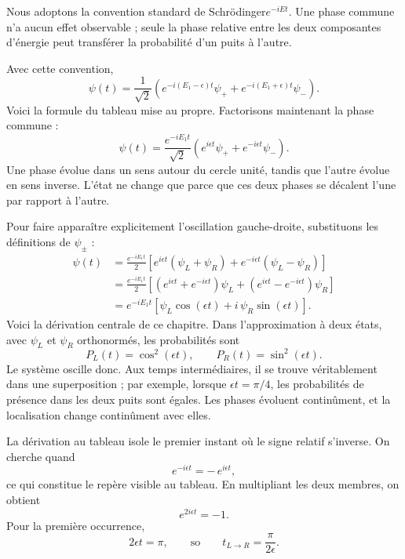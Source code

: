 Nous adoptons la convention standard de Schr\"odinger\(e^{-iEt}\). Une phase commune n’a aucun effet observable ; seule la phase relative entre les deux composantes d’énergie peut transférer la probabilité d’un puits à l’autre.

Avec cette convention, \begin{equation}
\psi(t)=\frac{1}{\sqrt{2}}\left(e^{-i(E_1-\epsilon)t}\psi_+ + e^{-i(E_1+\epsilon)t}\psi_-\right).
\end{equation}Voici la formule du tableau mise au propre. Factorisons maintenant la phase commune : \begin{equation}
\psi(t)=\frac{e^{-iE_1 t}}{\sqrt{2}}\left(e^{i\epsilon t}\psi_+ + e^{-i\epsilon t}\psi_-\right).
\end{equation}Une phase évolue dans un sens autour du cercle unité, tandis que l’autre évolue en sens inverse. L’état ne change que parce que ces deux phases se décalent l’une par rapport à l’autre.

Pour faire apparaître explicitement l’oscillation gauche-droite, substituons les définitions de \(\psi_\pm\) : \begin{align}
\psi(t)
&= \frac{e^{-iE_1 t}}{2}
\left[e^{i\epsilon t}(\psi_L+\psi_R)+e^{-i\epsilon t}(\psi_L-\psi_R)\right] \\
&= \frac{e^{-iE_1 t}}{2}
\left[(e^{i\epsilon t}+e^{-i\epsilon t})\psi_L+(e^{i\epsilon t}-e^{-i\epsilon t})\psi_R\right] \\
&= e^{-iE_1 t}\left[\psi_L\cos(\epsilon t)+i\,\psi_R\sin(\epsilon t)\right].
\end{align}Voici la dérivation centrale de ce chapitre. Dans l’approximation à deux états, avec \(\psi_L\) et \(\psi_R\) orthonormés, les probabilités sont \begin{equation}
P_L(t)=\cos^2(\epsilon t),
\qquad
P_R(t)=\sin^2(\epsilon t).
\end{equation}Le système oscille donc. Aux temps intermédiaires, il se trouve véritablement dans une superposition ; par exemple, lorsque \(\epsilon t=\pi/4\), les probabilités de présence dans les deux puits sont égales. Les phases évoluent continûment, et la localisation change continûment avec elles.

La dérivation au tableau isole le premier instant où le signe relatif s’inverse. On cherche quand \begin{equation}
e^{-i\epsilon t}=-\,e^{i\epsilon t},
\end{equation}ce qui constitue le repère visible au tableau. En multipliant les deux membres, on obtient \begin{equation}
e^{2i\epsilon t}=-1.
\end{equation}Pour la première occurrence, \begin{equation}
2\epsilon t=\pi,
\qquad\text{so}\qquad
t_{L\to R}=\frac{\pi}{2\epsilon}.
\end{equation}

